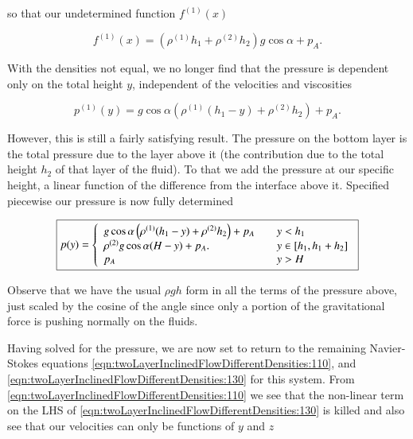 so that our undetermined function $f^{(1)}(x)$ 

\begin{equation}\label{eqn:twoLayerInclinedFlowDifferentDensities:335}
f^{(1)}(x) = \left(\rho^{(1)} h_1 + \rho^{(2)} h_2 \right) g \cos\alpha  + p_A.
\end{equation}

With the densities not equal, we no longer find that the pressure is dependent only on the total height $y$, independent of the velocities and viscosities

\begin{equation}\label{eqn:twoLayerInclinedFlowDifferentDensities:355}
p^{(1)}(y) = 
g \cos\alpha 
\left(
\rho^{(1)} (h_1 - y) + \rho^{(2)} h_2
\right)
+ p_A.
\end{equation}

However, this is still a fairly satisfying result.  The pressure on the bottom layer is the total pressure due to the layer above it (the contribution due to the total height $h_2$ of that layer of the fluid).  To that we add the pressure at our specific height, a linear function of the difference from the interface above it.  Specified piecewise our pressure is now fully determined

\begin{equation}\label{eqn:twoLayerInclinedFlowDifferentDensities:356}
\boxed{
p(y) =
\left\{
\begin{array}{l l}
g \cos\alpha 
\left(
\rho^{(1)} (h_1 - y) + \rho^{(2)} h_2
\right)
+ p_A 
& 
\quad \mbox{$y < h_1$} \\
\rho^{(2)} g \cos\alpha (H - y) + p_A.
& 
\quad \mbox{$y \in [h_1, h_1 + h_2]$} \\
p_A
& 
\quad \mbox{$y > H$}
\end{array}
\right.
}
\end{equation}

Observe that we have the usual $\rho g h$ form in all the terms of the pressure above, just scaled by the cosine of the angle since only a portion of the gravitational force is pushing normally on the fluids.

Having solved for the pressure, we are now set to return to the remaining Navier-Stokes equations \ref{eqn:twoLayerInclinedFlowDifferentDensities:110}, and \ref{eqn:twoLayerInclinedFlowDifferentDensities:130} for this system.  From \ref{eqn:twoLayerInclinedFlowDifferentDensities:110} we see that the non-linear term on the LHS of \ref{eqn:twoLayerInclinedFlowDifferentDensities:130} is killed and also see that our velocities can only be functions of $y$ and $z$

